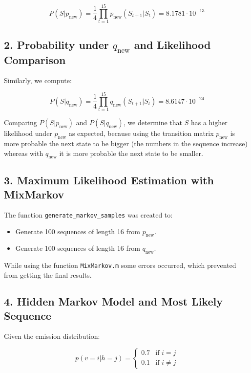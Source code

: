 \documentclass{article}
\begin{document}
\[
P(S | p_{\text{new}}) = \frac{1}{4} \prod_{t=1}^{15} p_{\text{new}}(S_{t+1} | S_t) = 8.1781 \cdot 10^{-13}
\]

\subsection*{2. Probability under \( q_{\text{new}} \) and Likelihood Comparison}

Similarly, we compute:

\[
P(S | q_{\text{new}}) = \frac{1}{4} \prod_{t=1}^{15} q_{\text{new}}(S_{t+1} | S_t) = 8.6147  \cdot 10^{-24}
\]

Comparing \( P(S | p_{\text{new}}) \) and \( P(S | q_{\text{new}}) \), we determine that \( S \) has a higher likelihood under \( p_{\text{new}} \) as expected, because using the transition matrix \( p_{\text{new}} \) is more probable the next state to be bigger (the numbers in the sequence increase) whereas with \( q_{\text{new}} \) it is more probable the next state to be smaller. 

\subsection*{3. Maximum Likelihood Estimation with MixMarkov}

The function \texttt{generate\_markov\_samples} was created to:
\begin{itemize}
    \item Generate 100 sequences of length 16 from \( p_{\text{new}} \).
    \item Generate 100 sequences of length 16 from \( q_{\text{new}} \).
\end{itemize}

While using the function \texttt{MixMarkov.m} some errors occurred, which prevented from getting the final results.


\subsection*{4. Hidden Markov Model and Most Likely Sequence}

Given the emission distribution:

\[
p(v = i | h = j) =
\begin{cases} 
0.7 & \text{if } i = j \\
0.1 & \text{if } i \neq j
\end{cases}
\]
\end{document}
